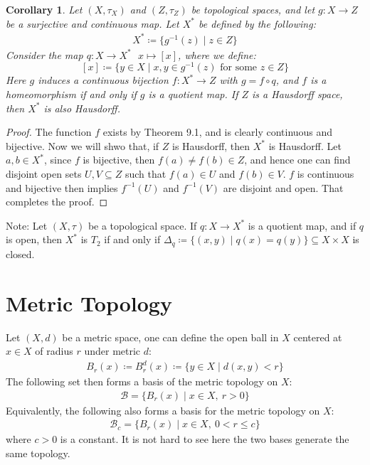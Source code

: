 \documentclass[11pt]{book}
\theoremstyle{break}
\theoremstyle{break}
\newtheorem{corT}[lem]{Corollary}
\newcommand{\note}{\color{red}Note: \color{black}}
\begin{document}
\begin{corT}
Let $(X,\tau_X)$ and $(Z,\tau_Z)$ be topological spaces, and let $g:X \to Z$ be a surjective and continuous map. Let $X^*$ be defined by the following:
\begin{align*}
X^*\coloneqq \{ g^{-1}(z) \mid z \in Z\}
\end{align*}
Consider the map $q:X \to X^* \ \ \ x\mapsto [x]$, where we define: 
$$[x]\coloneqq \{y \in X \mid x,y \in g^{-1}(z) \text{ for some }z\in Z\}$$ 
Here $g$ induces a continuous bijection $f:X^* \to Z$ with $g = f\circ q$, and $f$ is a homeomorphism if and only if $g$ is a quotient map. If $Z$ is a Hausdorff space, then $X^*$ is also Hausdorff. 
\end{corT}
\begin{proof}
The function $f$ exists by Theorem 9.1, and is clearly continuous and bijective. Now we will shwo that, if $Z$ is Hausdorff, then $X^*$ is Hausdorff. Let $a,b \in X^*$, since $f$ is bijective, then $f(a)\neq f(b) \in Z$, and hence one can find disjoint open sets $U,V \subseteq Z$ such that $f(a) \in U$ and $f(b) \in V$. $f$ is continuous and bijective then implies $f^{-1}(U)$ and $f^{-1}(V)$ are disjoint and open. That completes the proof. 
\end{proof}

\note Let $(X,\tau)$ be a topological space. If $q:X \to X^*$ is a quotient map, and if $q$ is open, then $X^*$ is $T_2$ if and only if $\Delta_q \coloneqq \{ (x,y) \mid q(x) = q(y) \} \subseteq X\times X$ is closed. 

\newpage
\section[Metric Topology]{\color{red}Metric Topology\color{black}}
Let $(X,d)$ be a metric space, one can define the open ball in $X$ centered at $x \in X$ of radius $r$ under metric $d$:
\begin{align*}
B_r(x) \coloneqq B_r^d(x) \coloneqq \{ y \in X \mid d(x,y) < r\}
\end{align*}
The following set then forms a basis of the metric topology on $X$:
\begin{align}
\mathcal{B} = \{B_r(x) \mid x \in X, \ r>0\}
\end{align}
Equivalently, the following also forms a basis for the metric topology on $X$:
\begin{align}
\mathcal{B}_c = \{B_r(x) \mid x \in X,\ 0<r\leq c\}
\end{align}
where $c >0$ is a constant. It is not hard to see here the two bases generate the same topology. 
\end{document}
